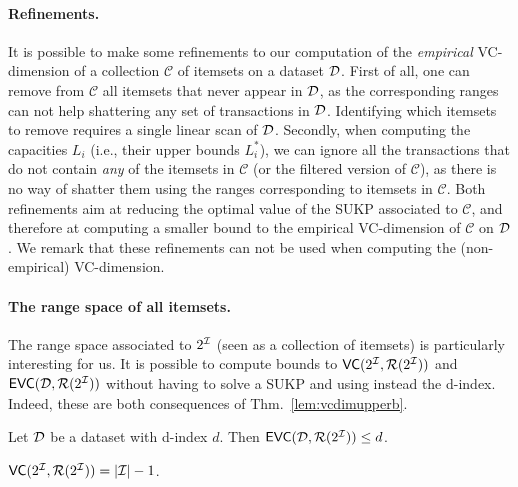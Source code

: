 \paragraph{Refinements.} It is possible to make some refinements to our
computation of the \emph{empirical} VC-dimension of a collection $\mathcal{C}$ of
itemsets on a dataset ${\cal D}$. First of all, one can remove from $\mathcal{C}$ all
itemsets that never appear in ${\cal D}$, as the corresponding ranges can not help
shattering any set of transactions in ${\cal D}$. Identifying which itemsets to
remove requires a single linear scan of ${\cal D}$. Secondly, when computing the
capacities $L_i$ (i.e., their upper bounds $L_i^*$), we can ignore all the
transactions that do not contain \emph{any} of the itemsets in $\mathcal{C}$ (or
the filtered version of $\mathcal{C}$), as there is no way of shatter them using
the ranges corresponding to itemsets in $\mathcal{C}$. Both refinements aim at
reducing the optimal value of the SUKP associated to $\mathcal{C}$, and
therefore at computing a smaller bound to the empirical VC-dimension of
$\mathcal{C}$ on ${\cal D}$. We remark that these refinements can not be used when
computing the (non-empirical) VC-dimension.

\paragraph{The range space of all itemsets.}
The range space associated to $2^{\cal I}$ (seen as a collection of itemsets) is
particularly interesting for us. It is possible  %
to compute bounds to $\mathsf{VC}(2^{\cal I},\mathcal{R}(2^{\cal I}))$ and
$\mathsf{EVC}({\cal D},\mathcal{R}(2^{\cal I}))$ without having to solve a SUKP and using instead the
d-index. Indeed, these are
both consequences of Thm.~\ref{lem:vcdimupperb}. 
\begin{corollary}\label{coroll:empvcdimubfirst}
  Let ${\cal D}$ be a dataset with d-index $d$. Then $\mathsf{EVC}({\cal D},\mathcal{R}(2^{\cal I}))\le d$.
\end{corollary}

\begin{corollary}\label{coroll:vcdimubfirst}
$\mathsf{VC}(2^{\cal I},\mathcal{R}(2^{\cal I}))=|{\cal I}|-1$.
\end{corollary}

